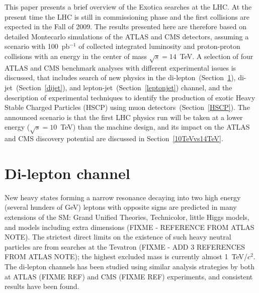 \documentclass{cimento}
\begin{document}
This paper presents a brief overview of the Exotica searches at the LHC. 
At the present time the LHC is still in commissioning phase 
and the first collisions are expected in the Fall of 2009.
The results presented here are therefore based on detailed 
Montecarlo simulations of the ATLAS and CMS detectors, 
assuming a scenario with 100~pb$^{-1}$ of collected integrated luminosity 
and proton-proton collisions with an energy in the center 
of mass $\sqrt{s} = 14$~TeV. 
A selection of four ATLAS and CMS benchmark analyses with different 
experimental issues is discussed, that includes 
search of new physics in the di-lepton~(Section~\ref{dilepton}), 
di-jet~(Section~\ref{dijet}), and lepton-jet~(Section~\ref{leptonjet}) channel, 
and the description of experimental techniques to identify the production of 
exotic Heavy Stable Charged Particles (HSCP) 
using muon detectors~(Section~\ref{HSCP}).
The announced scenario is that the first LHC physics run 
will be taken at a lower energy ($\sqrt{s} = 10$~TeV) 
than the machine design, and its impact on the ATLAS and CMS 
discovery potential are discussed in Section~\ref{10TeVvs14TeV}. 


\section{Di-lepton channel} \label{dilepton}

New heavy states forming a narrow resonance decaying 
into two high energy (several hunders of GeV) 
leptons with opposite signs are predicted in  
many extensions of the SM: Grand Unified Theories, 
Technicolor, little Higgs models, and models 
including extra dimensions (FIXME - REFERENCE FROM ATLAS NOTE). 
The strictest direct limits on the existence of such 
heavy neutral particles are from searches 
at the Tevatron (FIXME - ADD 3 REFERENCES FROM ATLAS NOTE); 
the highest excluded mass is currently almost 1~TeV/$c^2$.
The di-lepton channels has been studied using similar 
analysis strategies by both at ATLAS (FIXME REF) and CMS (FIXME REF)
experiments, and consistent results have been found. 
\end{document}
